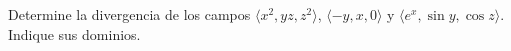 ﻿Determine la divergencia de los campos $\langle x^2,yz,z^2\rangle$, $\langle-y,x,0\rangle$ y $\langle e^x,\sin y,\cos z\rangle$. Indique sus dominios.
